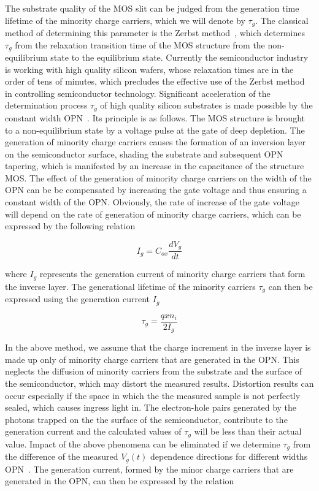 The substrate quality of the MOS slit can be judged from the
generation time lifetime of the minority charge carriers, which we
will denote by $\tau_g$. The classical method of determining this
parameter is the Zerbst method~\cite{3.2}, which determines $\tau_g$
from the relaxation transition time of the MOS structure from the
non-equilibrium state to the equilibrium state. Currently the
semiconductor industry is working with high quality silicon wafers,
whose relaxation times are in the order of tens of minutes, which
precludes the effective use of the Zerbst method in controlling
semiconductor technology. Significant acceleration of the
determination process $\tau_g$ of high quality silicon substrates is
made possible by the constant width OPN~\cite{3.1}. Its principle is
as follows. The MOS structure is brought to a non-equilibrium state by
a voltage pulse at the gate of deep depletion. The generation of
minority charge carriers causes the formation of an inversion layer on
the semiconductor surface, shading the substrate and subsequent OPN
tapering, which is manifested by an increase in the capacitance of the
structure MOS\@. The effect of the generation of minority charge
carriers on the width of the OPN can be be compensated by increasing
the gate voltage and thus ensuring a constant width of the
OPN\@. Obviously, the rate of increase of the gate voltage will depend
on the rate of generation of minority charge carriers, which can be
expressed by the following relation~\cite{3.3}

\begin{equation}\label{eq:3.4}
  I_g = C_{ox} \frac{dV_g}{dt}
\end{equation}

where $I_g$ represents the generation current of minority charge carriers that
form the inverse layer.  The generational lifetime of the minority carriers
$\tau_g$ can then be expressed using the generation current $I_g$~\cite{3.3}

\begin{equation}\label{eq:3.5}
  \tau_g = \frac{qxn_i}{2I_g}
\end{equation}

In the above method, we assume that the charge increment in the
inverse layer is made up only of minority charge carriers that are
generated in the OPN\@. This neglects the diffusion of minority
carriers from the substrate and the surface of the semiconductor,
which may distort the measured results. Distortion results can occur
especially if the space in which the the measured sample is not
perfectly sealed, which causes ingress light in. The electron-hole
pairs generated by the photons trapped on the the surface of the
semiconductor, contribute to the generation current and the calculated
values of $\tau_g$ will be less than their actual value.  Impact of
the above phenomena can be eliminated if we determine $\tau_g$ from
the difference of the measured $V_g(t)$ dependence directions for
different widths OPN~\cite{3.3, 3.10, 3.11, 3.12}. The generation
current, formed by the minor charge carriers that are generated in the
OPN, can then be expressed by the relation

